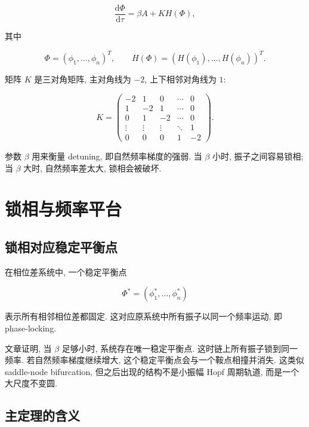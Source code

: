 \documentclass[oneside]{ctexart}
\newcommand{\dd}{\mathrm{d}}
\begin{document}
\begin{equation}
    \dfrac{\dd \Phi}{\dd \tau}=\beta A+K H(\Phi),
\end{equation}

其中

\begin{equation}
    \Phi=(\phi_1,
\dots,
\phi_n)^T,
    \qquad
    H(\Phi)=(H(\phi_1),
\dots,H(\phi_n))^T.
\end{equation}

矩阵 $K$ 是三对角矩阵, 主对角线为 $-2$, 上下相邻对角线为 $1$:

\begin{equation}
    K=
    \begin{pmatrix}
        -2&1&0&\cdots&0\\
        1&-2&1&\cdots&0\\
        0&1&-2&\cdots&0\\
        \vdots&\vdots&\vdots&\ddots&1\\
        0&0&0&1&-2
    \end{pmatrix}.
\end{equation}

参数 $\beta$ 用来衡量 detuning, 即自然频率梯度的强弱. 当 $\beta$ 小时, 振子之间容易锁相; 当 $\beta$ 大时, 自然频率差太大, 锁相会被破坏.

\section{锁相与频率平台}

\subsection{锁相对应稳定平衡点}

在相位差系统中, 一个稳定平衡点

\begin{equation}
    \Phi^*=(\phi_1^*,
\dots,
\phi_n^*)
\end{equation}

表示所有相邻相位差都固定. 这对应原系统中所有振子以同一个频率运动, 即 phase-locking.

文章证明, 当 $\beta$ 足够小时, 系统存在唯一稳定平衡点. 这时链上所有振子锁到同一频率. 若自然频率梯度继续增大, 这个稳定平衡点会与一个鞍点相撞并消失. 这类似 saddle-node bifurcation, 但之后出现的结构不是小振幅 Hopf 周期轨道, 而是一个大尺度不变圆.

\subsection{主定理的含义}
\end{document}
